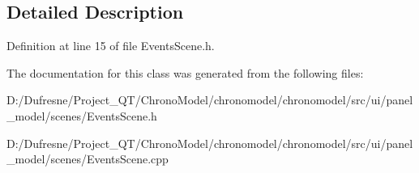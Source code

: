 \subsection{Detailed Description}


Definition at line 15 of file Events\-Scene.\-h.



The documentation for this class was generated from the following files\-:\begin{DoxyCompactItemize}
\item 
D\-:/\-Dufresne/\-Project\-\_\-\-Q\-T/\-Chrono\-Model/chronomodel/chronomodel/src/ui/panel\-\_\-model/scenes/Events\-Scene.\-h\item 
D\-:/\-Dufresne/\-Project\-\_\-\-Q\-T/\-Chrono\-Model/chronomodel/chronomodel/src/ui/panel\-\_\-model/scenes/Events\-Scene.\-cpp\end{DoxyCompactItemize}

